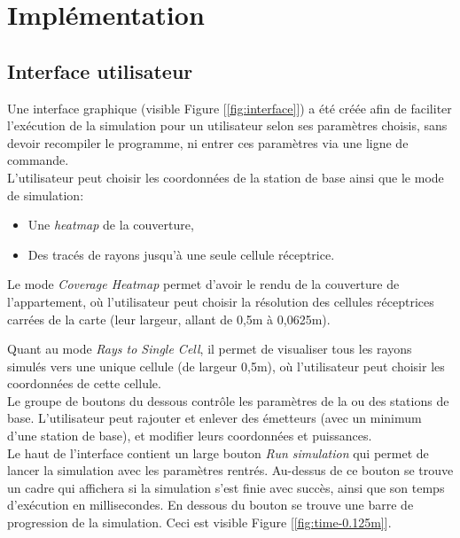 \chapter{Implémentation}
\label{chapter-2}




\section{Interface utilisateur}
Une interface graphique (visible Figure [\ref{fig:interface}]) a été créée afin de faciliter l'exécution de la simulation pour un utilisateur selon ses paramètres choisis, sans devoir recompiler le programme, ni entrer ces paramètres via une ligne de commande.\\

L'utilisateur peut choisir les coordonnées de la station de base ainsi que le mode de simulation:
\begin{itemize}
    \item Une \textit{heatmap} de la couverture,
    \item Des tracés de rayons jusqu'à une seule cellule réceptrice.
\end{itemize}

Le mode \textit{Coverage Heatmap} permet d'avoir le rendu de la couverture de l'appartement, où l'utilisateur peut choisir la résolution des cellules réceptrices carrées de la carte (leur largeur, allant de 0,5m à 0,0625m).

Quant au mode \textit{Rays to Single Cell}, il permet de visualiser tous les rayons simulés vers une unique cellule (de largeur 0,5m), où l'utilisateur peut choisir les coordonnées de cette cellule.\\

Le groupe de boutons du dessous contrôle les paramètres de la ou des stations de base. L'utilisateur peut rajouter et enlever des émetteurs (avec un minimum d'une station de base), et modifier leurs coordonnées et puissances.\\

Le haut de l'interface contient un large bouton \textit{Run simulation} qui permet de lancer la simulation avec les paramètres rentrés. Au-dessus de ce bouton se trouve un cadre qui affichera si la simulation s'est finie avec succès, ainsi que son temps d'exécution en millisecondes. En dessous du bouton se trouve une barre de progression de la simulation. Ceci est visible Figure [\ref{fig:time-0.125m}].\\

